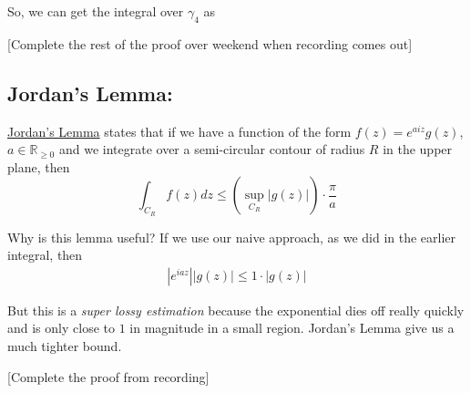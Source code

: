 \documentclass{article}
\newcommand{\R}{\mathbb{R}}
\begin{document}
So, we can get the integral over $\gamma_4$ as 

[Complete the rest of the proof over weekend when recording comes out]

\vskip 1cm
\subsection{Jordan's Lemma:}

\begin{dottedbox}
  \underline{Jordan's Lemma} states that if we have a function of the form $f(z) = e^{aiz} g(z)$, $a \in \R_{\geq 0}$ and we integrate over a semi-circular contour of radius $R$ in the upper plane, then 
  \[ \int_{C_R} f(z) dz  \leq \left( \sup_{C_R} \left| g(z) \right| \right) \cdot \frac{\pi}{a} \]
\end{dottedbox}

Why is this lemma useful? If we use our naive approach, as we did in the earlier integral, then 
\begin{align*}
  \left| e^{iaz} \right| \left| g(z) \right| \leq 1 \cdot \left| g(z) \right|
\end{align*}

But this is a \emph{super lossy estimation} because the exponential dies off really quickly and is only close to $1$ in magnitude in a small region. Jordan's Lemma give us a much tighter bound.

\vskip 0.5cm

[Complete the proof from recording]
\end{document}
